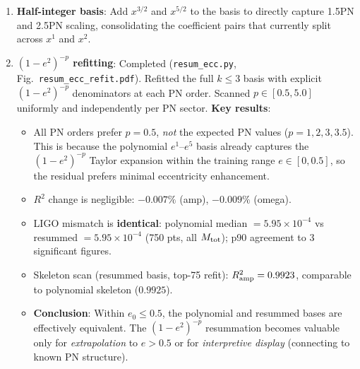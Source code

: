 \documentclass[11pt,letterpaper]{article}
\begin{document}
\begin{enumerate}[nosep]
\item[$\circ$] \textbf{Half-integer basis}: Add $x^{3/2}$ and $x^{5/2}$ to the basis to directly capture 1.5PN and 2.5PN scaling, consolidating the coefficient pairs that currently split across $x^1$ and $x^2$.

\item[\checkmark] \textbf{$(1-e^2)^{-p}$ refitting}: Completed (\texttt{resum\_ecc.py}, Fig.~\texttt{resum\_ecc\_refit.pdf}).
Refitted the full $k\!\leq\!3$ basis with explicit $(1-e^2)^{-p}$ denominators at each PN order.
Scanned $p \in [0.5, 5.0]$ uniformly and independently per PN sector. \textbf{Key results}:
\begin{itemize}[nosep]
  \item All PN orders prefer $p = 0.5$, \emph{not} the expected PN values ($p = 1, 2, 3, 3.5$).
  This is because the polynomial $e^1$--$e^5$ basis already captures the $(1-e^2)^{-p}$ Taylor expansion within the training range $e \in [0, 0.5]$, so the residual prefers minimal eccentricity enhancement.
  \item $R^2$ change is negligible: $-0.007\%$ (amp), $-0.009\%$ (omega).
  \item LIGO mismatch is \textbf{identical}: polynomial median $= 5.95 \times 10^{-4}$ vs resummed $= 5.95 \times 10^{-4}$ (750 pts, all $M_{\rm tot}$); p90 agreement to 3 significant figures.
  \item Skeleton scan (resummed basis, top-75 refit): $R^2_{\rm amp} = 0.9923$, comparable to polynomial skeleton ($0.9925$).
  \item \textbf{Conclusion}: Within $e_0 \leq 0.5$, the polynomial and resummed bases are effectively equivalent. The $(1-e^2)^{-p}$ resummation becomes valuable only for \emph{extrapolation} to $e > 0.5$ or for \emph{interpretive display} (connecting to known PN structure).
\end{itemize}
\end{enumerate}
\end{document}
